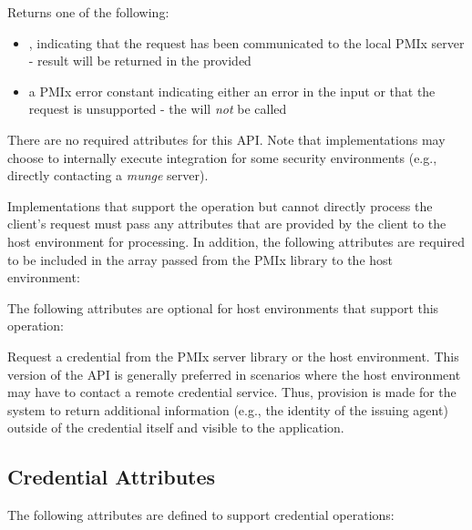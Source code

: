 Returns one of the following:

\begin{itemize}
    \item {}, indicating that the request has been communicated to the local \ac{PMIx} server - result will be returned in the provided 
    \item a \ac{PMIx} error constant indicating either an error in the input or that the request is unsupported - the  will \textit{not} be called
\end{itemize}

\reqattrstart
There are no required attributes for this \ac{API}. Note that implementations may choose to internally
execute integration for some security environments (e.g., directly
contacting a \textit{munge} server).

Implementations that support the operation but cannot directly process the client's request must pass any attributes that are provided by the client to the host environment for processing. In addition, the following attributes are required to be included in the  array passed from the \ac{PMIx} library to the host environment:


\reqattrend

\optattrstart
The following attributes are optional for host environments that support this operation:


\optattrend

\descr

Request a credential from the \ac{PMIx} server library or the host environment.  This version of the \ac{API} is generally preferred in scenarios where the host environment may have to contact a remote credential service. Thus, provision is made for the system to return additional information (e.g., the identity of the issuing agent) outside of the credential itself and visible to the application.

\subsection{Credential Attributes}
\label{chap:api_security:attributes}

The following attributes are defined to support credential operations:

